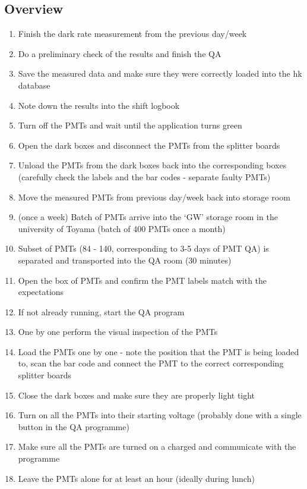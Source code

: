 \documentclass[12pt,a4paper]{article}
\begin{document}
\subsection{Overview}
\begin{enumerate}
    \item Finish the dark rate measurement from the previous day/week
    \item Do a preliminary check of the results and finish the QA
    \item Save the measured data and make sure they were correctly loaded into the hk database
    \item Note down the results into the shift logbook
    \item Turn off the PMTs and wait until the application turns green
    \item Open the dark boxes and disconnect the PMTs from the splitter boards
    \item Unload the PMTs from the dark boxes back into the corresponding boxes (carefully check the labels and the bar codes - separate faulty PMTs)
    \item Move the measured PMTs from previous day/week back into storage room
    \item (once a week) Batch of PMTs arrive into the `GW' storage room in the university of Toyama (batch of 400 PMTs once a month)
    \item Subset of PMTs (84 - 140, corresponding to 3-5 days of PMT QA) is separated and transported into the QA room (30 minutes)
    \item Open the box of PMTs and confirm the PMT labels match with the expectations
    \item If not already running, start the QA program
    \item One by one perform the visual inspection of the PMTs
    \item Load the PMTs one by one - note the position that the PMT is being loaded to, scan the bar code and connect the PMT to the correct corresponding splitter boards
    \item Close the dark boxes and make sure they are properly light tight
    \item Turn on all the PMTs into their starting voltage (probably done with a single button in the QA programme)
    \item Make sure all the PMTs are turned on a charged and communicate with the programme
    \item Leave the PMTs alone for at least an hour (ideally during lunch)

\end{enumerate}
\end{document}
